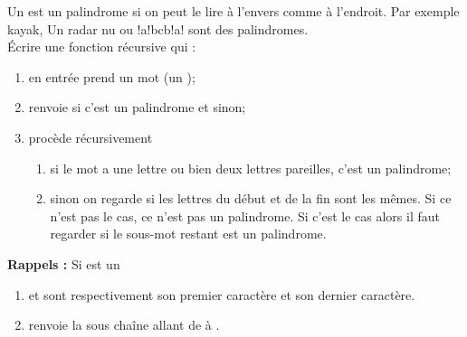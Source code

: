 \documentclass[a4paper,12pt,french]{article}
\begin{document}
\begin{exercice}[ : palindromes]
	Un  est un palindrome si on peut le lire à l'envers comme à l'endroit. Par exemple \og kayak\fg{}, \og  Un radar nu \fg{} ou \og !a!bcb!a!\fg{} sont des palindromes.\\
	\'Ecrire une fonction récursive  qui :
	\begin{enumerate}[--]
		\item 	en entrée prend un mot (un );
		\item 	renvoie  si c'est un palindrome et  sinon;
		\item 	procède récursivement
		\begin{enumerate}[\textbullet]
			\item 	si le mot a une lettre ou bien deux lettres pareilles, c'est un palindrome;
			\item 	sinon on regarde si les lettres du début et de la fin sont les mêmes. Si ce n'est pas le cas, ce n'est pas un palindrome. Si c'est le cas alors il faut regarder si le sous-mot restant est un palindrome.
		\end{enumerate}
	\end{enumerate}
	\textbf{Rappels :}
	Si  est un 
	\begin{enumerate}[--]
		\item 	{} et  sont respectivement son premier caractère et son dernier caractère.
		\item 	{} renvoie la sous chaîne allant de  à .
	\end{enumerate}
\end{exercice}
\end{document}
